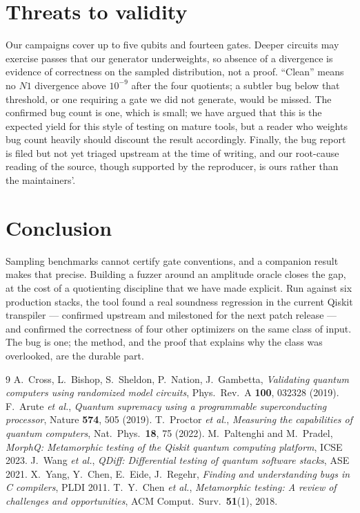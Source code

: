 \documentclass[11pt]{article}
\begin{document}
\section{Threats to validity}

Our campaigns cover up to five qubits and fourteen gates. Deeper circuits
may exercise passes that our generator underweights, so absence of a
divergence is evidence of correctness on the sampled distribution, not a
proof. ``Clean'' means no $N1$ divergence above $10^{-9}$ after the four
quotients; a subtler bug below that threshold, or one requiring a gate we
did not generate, would be missed. The confirmed bug count is one, which
is small; we have argued that this is the expected yield for this style
of testing on mature tools, but a reader who weights bug count heavily
should discount the result accordingly. Finally, the bug report is filed
but not yet triaged upstream at the time of writing, and our root-cause
reading of the source, though supported by the reproducer, is ours rather
than the maintainers'.

\section{Conclusion}

Sampling benchmarks cannot certify gate conventions, and a companion
result makes that precise. Building a fuzzer around an amplitude oracle
closes the gap, at the cost of a quotienting discipline that we have made
explicit. Run against six production stacks, the tool found a real
soundness regression in the current Qiskit transpiler --- confirmed
upstream and milestoned for the next patch release --- and confirmed the
correctness of four other optimizers on the same class of input. The bug
is one; the method, and the proof that explains why the class was
overlooked, are the durable part.

\begin{thebibliography}{9}
 A.~Cross, L.~Bishop, S.~Sheldon, P.~Nation,
J.~Gambetta, \emph{Validating quantum computers using randomized model
circuits}, Phys.\ Rev.\ A \textbf{100}, 032328 (2019).
 F.~Arute \emph{et al.}, \emph{Quantum supremacy using
a programmable superconducting processor}, Nature \textbf{574}, 505
(2019).
 T.~Proctor \emph{et al.}, \emph{Measuring the
capabilities of quantum computers}, Nat.\ Phys.\ \textbf{18}, 75 (2022).
 M.~Paltenghi and M.~Pradel, \emph{MorphQ: Metamorphic
testing of the Qiskit quantum computing platform}, ICSE 2023.
 J.~Wang \emph{et al.}, \emph{QDiff: Differential testing
of quantum software stacks}, ASE 2021.
 X.~Yang, Y.~Chen, E.~Eide, J.~Regehr, \emph{Finding and
understanding bugs in C compilers}, PLDI 2011.
 T.~Y.~Chen \emph{et al.}, \emph{Metamorphic
testing: A review of challenges and opportunities}, ACM Comput.\ Surv.\
\textbf{51}(1), 2018.
\end{thebibliography}
\end{document}
